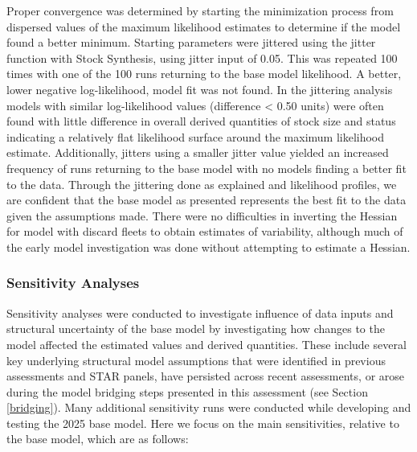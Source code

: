 \documentclass[
  english,
]{article}
\begin{document}
Proper convergence was determined by starting the minimization process
from dispersed values of the maximum likelihood estimates to determine
if the model found a better minimum. Starting parameters were jittered
using the jitter function with Stock Synthesis, using jitter input of
0.05. This was repeated 100 times with one of the 100 runs returning to
the base model likelihood. A better, lower negative log-likelihood,
model fit was not found. In the jittering analysis models with similar
log-likelihood values (difference \textless{} 0.50 units) were often
found with little difference in overall derived quantities of stock size
and status indicating a relatively flat likelihood surface around the
maximum likelihood estimate. Additionally, jitters using a smaller
jitter value yielded an increased frequency of runs returning to the
base model with no models finding a better fit to the data. Through the
jittering done as explained and likelihood profiles, we are confident
that the base model as presented represents the best fit to the data
given the assumptions made. There were no difficulties in inverting the
Hessian for model with discard fleets to obtain estimates of
variability, although much of the early model investigation was done
without attempting to estimate a Hessian.

\subsubsection{Sensitivity Analyses}\label{sensitivities}

Sensitivity analyses were conducted to investigate influence of data
inputs and structural uncertainty of the base model by investigating how
changes to the model affected the estimated values and derived
quantities. These include several key underlying structural model
assumptions that were identified in previous assessments and STAR
panels, have persisted across recent assessments, or arose during the
model bridging steps presented in this assessment (see Section
\ref{bridging}). Many additional sensitivity runs were conducted while
developing and testing the 2025 base model. Here we focus on the main
sensitivities, relative to the base model, which are as follows:
\end{document}

